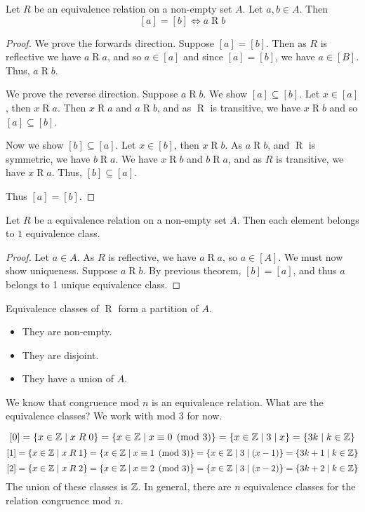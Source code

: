 \documentclass{article}
\begin{document}
  \begin{theorem}
    Let $R$ be an equivalence relation on a non-empty set $A$. Let $a, b \in A$. Then \[
      [a] = [b] \iff a \mathrel{R} b
    \]
  \end{theorem}
  \begin{proof}

    We prove the forwards direction.
    Suppose $[a] = [b]$. Then as $R$ is reflective we have $a \mathrel{R} a$, and so $a \in [a]$ and since $[a] = [b]$, we have $a \in [B]$. Thus, $a \mathrel{R} b$.

    We prove the reverse direction.
    Suppose $a \mathrel{R} b$. We show $[a] \subseteq [b]$. Let $x \in [a]$, then $x \mathrel{R} a$. Then $x \mathrel{R} a$ and $a \mathrel{R} b$, and as $\mathrel{R}$ is transitive, we have $x \mathrel{R} b$ and so $[a] \subseteq [b]$.

    Now we show $[b] \subseteq [a]$. Let $x \in [b]$, then $x \mathrel{R} b$. As $a \mathrel{R} b$, and $\mathrel{R}$ is symmetric, we have $b \mathrel{R} a$. We have $x \mathrel{R} b$ and $b \mathrel{R} a$, and as $R$ is transitive, we have $x \mathrel{R} a$. Thus, $[b] \subseteq [a]$.

    Thus $[a] = [b]$.
  \end{proof}
  \begin{theorem}
    Let $R$ be a equivalence relation on a non-empty set $A$. Then each element belongs to $1$ equivalence class.
  \end{theorem}
  \begin{proof}
    Let $a \in A$. As $R$ is reflective, we have $a \mathrel{R} a$, so $a \in [A]$. We must now show uniqueness.
    Suppose $a \mathrel{R} b$. By previous theorem, $[b] = [a]$, and thus $a$ belongs to 1 unique equivalence class.
  \end{proof}
  \begin{proposition}
    Equivalence classes of $\mathrel{R}$ form a partition of $A$.
    \begin{itemize}
      \item They are non-empty.
      \item They are disjoint.
      \item They have a union of $A$.
    \end{itemize}
  \end{proposition}
  \begin{example}
    We know that congruence mod $n$ is an equivalence relation. What are the equivalence classes? We work with mod $3$ for now.

    \[
      [0] = \{x \in \mathbb{Z} \mid x \mathrel{R} 0\} = \{x \in \mathbb{Z} \mid x \equiv 0 \pmod{3}\} = \{x \in \mathbb{Z} \mid 3 \mid x\} = \{3k \mid k \in \mathbb{Z}\}
    \]
    \[
      [1] = \{x \in \mathbb{Z} \mid x \mathrel{R} 1\} = \{x \in \mathbb{Z} \mid x \equiv 1 \pmod{3}\} = \{x \in \mathbb{Z} \mid 3 \mid (x-1)\} = \{3k + 1 \mid k \in \mathbb{Z}\}
    \]
    \[
      [2] = \{x \in \mathbb{Z} \mid x \mathrel{R} 2\} = \{x \in \mathbb{Z} \mid x \equiv 2 \pmod{3}\} = \{x \in \mathbb{Z} \mid 3 \mid (x-2)\} = \{3k + 2 \mid k \in \mathbb{Z}\}
    \]
    The union of these classes is $\mathbb{Z}$.
    In general, there are $n$ equivalence classes for the relation congruence mod $n$.
  \end{example}
\end{document}
